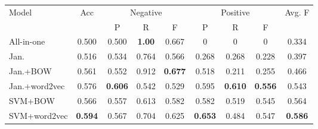 \documentclass[paperwidth=47in,paperheight=71in,final, 16pt]{baposter}
\begin{document}
\begin{poster}
{\begin{tabular}{|l|c|ccc|cccc|}
\multirow{2}{*}{Model} & \multirow{2}{*}{Acc} & \multicolumn{3}{|c|}{Negative} & \multicolumn{3}{|c|}{Positive} & \multirow{2}{*}{Avg. F}\\
\cline{3-8}
& & \multicolumn{1}{|c|}{P} & \multicolumn{1}{|c|}{R} & \multicolumn{1}{|c|}{F} & \multicolumn{1}{|c|}{P} & \multicolumn{1}{|c|}{R} & \multicolumn{1}{|c|}{F} & \\
\hline
All-in-one & \multicolumn{1}{|c|}{0.500} & \multicolumn{1}{|c|}{0.500} & \multicolumn{1}{|c|}{\textbf{1.00}} & \multicolumn{1}{|c|}{0.667} & \multicolumn{1}{|c|}{0} & \multicolumn{1}{|c|}{0} & \multicolumn{1}{|c|}{0} & \multicolumn{1}{|c|}{0.334}\\
Jan.& \multicolumn{1}{|c|}{0.516} &\multicolumn{1}{|c|}{0.534} & \multicolumn{1}{|c|}{0.764} &\multicolumn{1}{|c|}{0.566} &\multicolumn{1}{|c|}{0.268}&\multicolumn{1}{|c|}{0.268}& \multicolumn{1}{|c|}{0.228} & \multicolumn{1}{|c|}{0.397}\\
Jan.+BOW&\multicolumn{1}{|c|}{0.561}  &\multicolumn{1}{|c|}{0.552} & \multicolumn{1}{|c|}{0.912}&\multicolumn{1}{|c|}{\textbf{0.677}} & \multicolumn{1}{|c|}{0.518}&\multicolumn{1}{|c|}{0.211} & \multicolumn{1}{|c|}{0.255} & \multicolumn{1}{|c|}{0.466}\\
Jan.+word2vec&\multicolumn{1}{|c|}{0.576} &\multicolumn{1}{|c|}{\textbf{0.606}} &\multicolumn{1}{|c|}{0.542} &\multicolumn{1}{|c|}{0.529} &\multicolumn{1}{|c|}{0.595}&\multicolumn{1}{|c|}{\textbf{0.610}} & \multicolumn{1}{|c|}{\textbf{0.556}} &\multicolumn{1}{|c|}{0.543} \\
SVM+BOW &\multicolumn{1}{|c|}{0.566} &\multicolumn{1}{|c|}{0.557} &\multicolumn{1}{|c|}{0.613} & \multicolumn{1}{|c|}{0.582}& \multicolumn{1}{|c|}{0.582}& \multicolumn{1}{|c|}{0.519} & \multicolumn{1}{|c|}{0.545} & \multicolumn{1}{|c|}{0.564}\\
SVM+word2vec&\multicolumn{1}{|c|}{\textbf{0.594}}  &\multicolumn{1}{|c|}{0.567} &\multicolumn{1}{|c|}{0.704} &\multicolumn{1}{|c|}{0.625}& \multicolumn{1}{|c|}{\textbf{0.653}}& \multicolumn{1}{|c|}{0.484} & \multicolumn{1}{|c|}{0.547} & \multicolumn{1}{|c|}{\textbf{0.586}}\\
\hline
\end{tabular}

\vspace*{2ex}

}





\end{poster}
\end{document}
